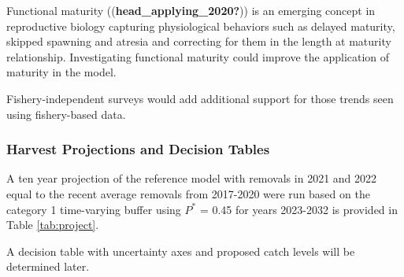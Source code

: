 \documentclass[11pt,
  english,
  a4paper,
]{article}
\begin{document}
\leavevmode\tagmcend\tagstructend\par


Functional maturity ({(\textbf{head\_applying\_2020?})\leavevmode\tagmcend\tagstructend}) is an emerging concept in reproductive biology capturing physiological behaviors such as delayed maturity, skipped spawning and atresia and correcting for them in the length at maturity relationship. Investigating functional maturity could improve the application of maturity in the model.

\leavevmode\tagmcend\tagstructend\par


Fishery-independent surveys would add additional support for those trends seen using fishery-based data.

\leavevmode\tagmcend\tagstructend\par


\hypertarget{harvest-projections-and-decision-tables}{%
\subsubsection{Harvest Projections and Decision Tables}\label{harvest-projections-and-decision-tables}}

\leavevmode\tagmcend\tagstructend


A ten year projection of the reference model with removals in 2021 and 2022 equal to the recent average removals from 2017-2020 were run based on the category 1 time-varying buffer using {\(P^*\)\leavevmode\tagmcend\tagstructend} = 0.45 for years 2023-2032 is provided in Table \ref{tab:project}.

\leavevmode\tagmcend\tagstructend\par


A decision table with uncertainty axes and proposed catch levels will be determined later.

\leavevmode\tagmcend\tagstructend\par

\end{document}
